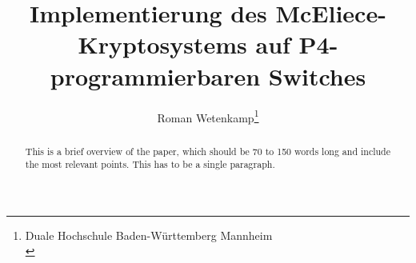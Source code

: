 \documentclass[utf8, biblatex]{lni}
\begin{document}
\title[Ein Kurztitel]{Implementierung des McEliece-Kryptosystems auf P4-programmierbaren Switches}
\author[Roman Wetenkamp]
{Roman Wetenkamp\footnote{Duale Hochschule Baden-Württemberg Mannheim\\ }}
\editor{} %
\maketitle
\begin{abstract}
This is a brief overview of the paper, which should be 70 to 150 words long and
include the most relevant points. This has to be a single paragraph.
\end{abstract}
\end{document}
